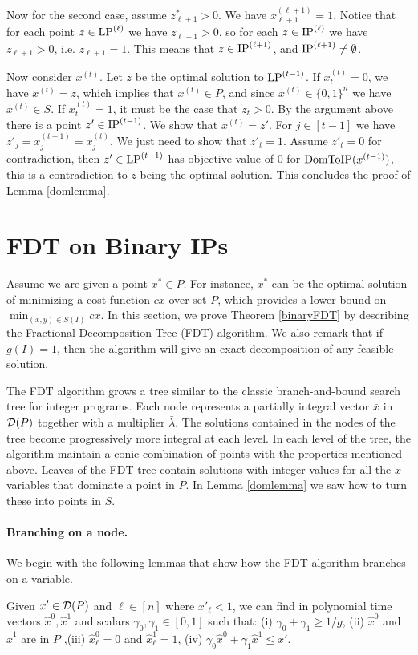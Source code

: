 Now for the second case, assume $z^*_{\ell+1} > 0$. We have $x^{(\ell+1)}_{\ell+1}=1$. Notice that for each point $z\in \operatorname{LP}^{(\ell)}$ we have $z_{\ell+1} >0$, so for each $z\in \operatorname{IP}^{(\ell)}$ we have $z_{\ell+1}>0$, i.e. $z_{\ell+1}=1$. This means that $z\in \operatorname{IP}^{(\ell+1)}$, and $\operatorname{IP}^{(\ell+1)} \neq \emptyset$.

Now consider $x^{(t)}$. Let $z$ be the optimal solution to $\operatorname{LP}^{(t-1)}$. If $x^{(t)}_t = 0$, we have $x^{(t)} = z$, which implies that $x^{(t)}\in P$, and since $x^{(t)}\in \{0,1\}^n$ we have $x^{(t)}\in S$. If $x^{(t)}_t =1$, it must be the case that $z_t > 0$. By the argument above there is a point $z'\in \operatorname{IP}^{(t-1)}$. We show that $x^{(t)} = z'$. For $j\in [t-1]$ we have $z'_j= x_j^{(t-1)}=x_j^{(t)}$. We just need to show that $z'_t = 1$. Assume $z'_t	 = 0$ for contradiction, then $z'\in \operatorname{LP}^{(t-1)}$ has objective value of $0$ for $\operatorname{{{DomToIP}}}(x^{(t-1)})$, this is a contradiction to $z$ being the optimal solution. This concludes the proof of Lemma \ref{domlemma}. 





\section{FDT on Binary IPs}
\label{sec:binaryfdt}

Assume we are given a point $x^*\in P$. For instance, $x^*$ can be the optimal solution of minimizing a cost function $cx$ over set $P$, which provides a lower bound on $\min_{(x,y)\in S(I)} cx$.  In this section, we prove Theorem \ref{binaryFDT} by describing the Fractional Decomposition Tree (FDT) algorithm. We also remark that if $g(I)=1$, then the algorithm will give an exact decomposition of any feasible solution. 


The FDT algorithm grows a tree similar to the classic branch-and-bound search tree for integer programs. Each node represents a partially integral vector $\bar{x}$ in $\operatorname{\mathcal{D}}(P)$ together with a multiplier $\bar{\lambda}$. The solutions contained in the nodes of the tree become progressively more integral at each level. In each level of the tree, the algorithm maintain a conic combination of points with the properties mentioned above. Leaves of the FDT tree contain solutions with integer values for all the $x$ variables that dominate a point in $P$. In Lemma  \ref{domlemma} we saw how to turn these into points in $S$. 

\paragraph{Branching on a node.}
We begin with the following lemmas that show how the FDT algorithm branches on a variable.
\begin{lemma}\label{LPClemma}
	Given $x'\in \operatorname{\mathcal{D}}(P)$ and $\ell\in [n]$ where $x'_{\ell}<1$, we can find in polynomial time vectors $\hat{x}^0,\hat{x}^1$ and scalars $\gamma_0,\gamma_1 \in [0,1]$ such that: (i) $\gamma_0 + \gamma_1  \geq 1/g$, (ii) $\hat{x}^0$ and $\hat{x}^1$ are in  $ P$
	,(iii) $\hat{x}^0_\ell=0$ and $\hat{x}^1_\ell=1$, (iv) $\gamma_0 \hat{x}^0 + \gamma_1\hat{x}^1 \leq x'$.
\end{lemma}


